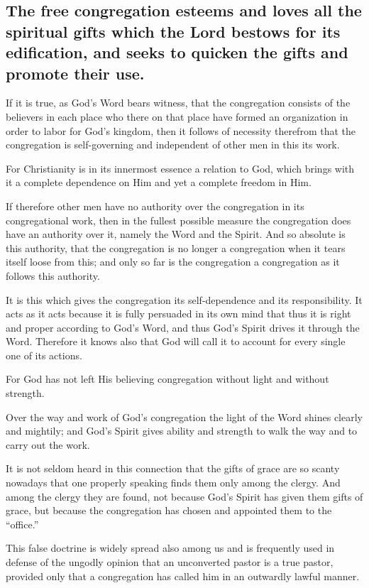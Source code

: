 \subsection{The free congregation esteems and loves all the spiritual gifts which the Lord bestows for its edification, and seeks to quicken the gifts and promote their use.}

If it is true, as God’s Word bears witness, that the congregation consists of the believers in each place who there on that place have formed an organization in order to labor for God’s kingdom, then it follows of necessity therefrom that the congregation is self-governing and independent of other men in this its work.

For Christianity is in its innermost essence a relation to God, which brings with it a complete dependence on Him and yet a complete freedom in Him.

If therefore other men have no authority over the congregation in its congregational work, then in the fullest possible measure the congregation does have an authority over it, namely the Word and the Spirit. And so absolute is this authority, that the congregation is no longer a congregation when it tears itself loose from this; and only so far is the congregation a congregation as it follows this authority.

It is this which gives the congregation its self-dependence and its responsibility. It acts as it acts because it is fully persuaded in its own mind that thus it is right and proper according to God’s Word, and thus God’s Spirit drives it through the Word. Therefore it knows also that God will call it to account for every single one of its actions.

For God has not left His believing congregation without light and without strength.

Over the way and work of God’s congregation the light of the Word shines clearly and mightily; and God’s Spirit gives ability and strength to walk the way and to carry out the work.

It is not seldom heard in this connection that the gifts of grace are so scanty nowadays that one properly speaking finds them only among the clergy. And among the clergy they are found, not because God’s Spirit has given them gifts of grace, but because the congregation has chosen and appointed them to the “office.”

This false doctrine is widely spread also among us and is frequently used in defense of the ungodly opinion that an unconverted pastor is a true pastor, provided only that a congregation has called him in an outwardly lawful manner.

